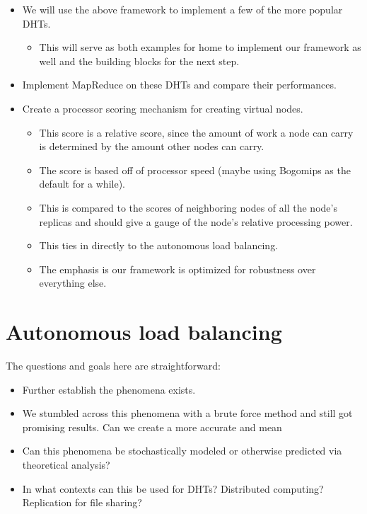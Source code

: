 \begin{itemize}
	
	\item We will use the above framework to implement a few of the more popular DHTs.
	\begin{itemize}
		\item This will serve as both examples for home to implement our framework as well and the building blocks for the next step.
	\end{itemize}
	\item Implement MapReduce on these DHTs and compare their performances.
	\item Create a  processor scoring mechanism for creating virtual nodes.
	\begin{itemize}
		\item This score is a relative score, since the amount of work a node can carry is determined by the amount other nodes can carry.
		\item The score is based off of processor speed (maybe using Bogomips as the default for a while).
		\item This is compared to the scores of neighboring nodes  of all the node's replicas and should give a gauge of the node's relative processing power.
		\item This ties in directly to the autonomous load balancing.
	\end{itemize}
	\begin{itemize}
		\item The emphasis is our framework is optimized for robustness over everything else.
	\end{itemize}
	
\end{itemize}



\section{Autonomous load balancing}

The questions and goals here are straightforward:
\begin{itemize}
	\item Further establish the phenomena exists.
	\item We stumbled across this phenomena with a brute force method and still got promising results.  
	Can we create a more accurate and mean
	\item Can this phenomena be stochastically modeled or otherwise predicted via theoretical analysis?
	\item In what contexts can this be used for DHTs?  Distributed computing?  Replication for file sharing?
	
\end{itemize}





